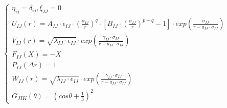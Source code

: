 \documentclass[12pt]{article}
\begin{document}
\begin{eqnarray*}
\left\{\begin{array}{l}
\eta_{ij}=\delta_{ij},\xi_{IJ}=0 \\
U_{IJ}\left(r\right)=A_{IJ}\cdot\epsilon_{IJ}\cdot \left(\frac{\sigma_{IJ}}{r}\right)^q\cdot \left[B_{IJ}\cdot \left(\frac{\sigma_{IJ}}{r}\right)^{p-q}-1\right]\cdot exp\left(\frac{\sigma_{IJ}}{r-a_{IJ}\cdot \sigma_{IJ}}\right) \\
V_{IJ}\left(r\right)=\sqrt{\lambda_{IJ}\cdot \epsilon_{IJ}}\cdot exp\left(\frac{\gamma_{IJ}\cdot \sigma_{IJ}}{r-a_{IJ}\cdot \sigma_{IJ}}\right) \\ 
F_{IJ}\left(X\right)=-X \\
P_{IJ}\left(\Delta r\right)=1 \\ 
W_{IJ}\left(r\right)=\sqrt{\lambda_{IJ}\cdot \epsilon_{IJ}}\cdot exp\left(\frac{\gamma_{IJ}\cdot \sigma_{IJ}}{r-a_{IJ}\cdot \sigma_{IJ}}\right) \\
G_{JIK}\left(\theta\right)=\left(cos\theta+\frac{1}{3}\right)^2
\end{array}\right.
\end{eqnarray*} 
\end{document}
